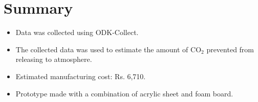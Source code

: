 \section{Summary}


\begin{itemize}
\item Data was collected using ODK-Collect.
\item The collected data was used to estimate the amount of CO$_2$ prevented from releasing to atmosphere.
\item Estimated manufacturing cost: Rs. 6,710.
\item Prototype made with a combination of acrylic sheet and foam board.




\end{itemize}




